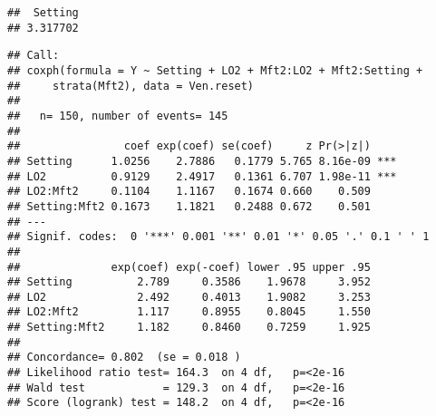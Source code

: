 \documentclass[
]{article}
\newenvironment{Shaded}{\begin{snugshade}}{\end{snugshade}}
\newcommand{\AttributeTok}[1]{\textcolor[rgb]{0.77,0.63,0.00}{#1}}
\newcommand{\CommentTok}[1]{\textcolor[rgb]{0.56,0.35,0.01}{\textit{#1}}}
\newcommand{\DecValTok}[1]{\textcolor[rgb]{0.00,0.00,0.81}{#1}}
\newcommand{\FunctionTok}[1]{\textcolor[rgb]{0.00,0.00,0.00}{#1}}
\newcommand{\NormalTok}[1]{#1}
\newcommand{\OtherTok}[1]{\textcolor[rgb]{0.56,0.35,0.01}{#1}}
\newcommand{\SpecialCharTok}[1]{\textcolor[rgb]{0.00,0.00,0.00}{#1}}
\begin{document}
\begin{verbatim}
##  Setting 
## 3.317702
\end{verbatim}

\begin{Shaded}
\end{Shaded}

\begin{verbatim}
## Call:
## coxph(formula = Y ~ Setting + LO2 + Mft2:LO2 + Mft2:Setting + 
##     strata(Mft2), data = Ven.reset)
## 
##   n= 150, number of events= 145 
## 
##                coef exp(coef) se(coef)     z Pr(>|z|)    
## Setting      1.0256    2.7886   0.1779 5.765 8.16e-09 ***
## LO2          0.9129    2.4917   0.1361 6.707 1.98e-11 ***
## LO2:Mft2     0.1104    1.1167   0.1674 0.660    0.509    
## Setting:Mft2 0.1673    1.1821   0.2488 0.672    0.501    
## ---
## Signif. codes:  0 '***' 0.001 '**' 0.01 '*' 0.05 '.' 0.1 ' ' 1
## 
##              exp(coef) exp(-coef) lower .95 upper .95
## Setting          2.789     0.3586    1.9678     3.952
## LO2              2.492     0.4013    1.9082     3.253
## LO2:Mft2         1.117     0.8955    0.8045     1.550
## Setting:Mft2     1.182     0.8460    0.7259     1.925
## 
## Concordance= 0.802  (se = 0.018 )
## Likelihood ratio test= 164.3  on 4 df,   p=<2e-16
## Wald test            = 129.3  on 4 df,   p=<2e-16
## Score (logrank) test = 148.2  on 4 df,   p=<2e-16
\end{verbatim}

\begin{Shaded}
\end{Shaded}
\end{document}

